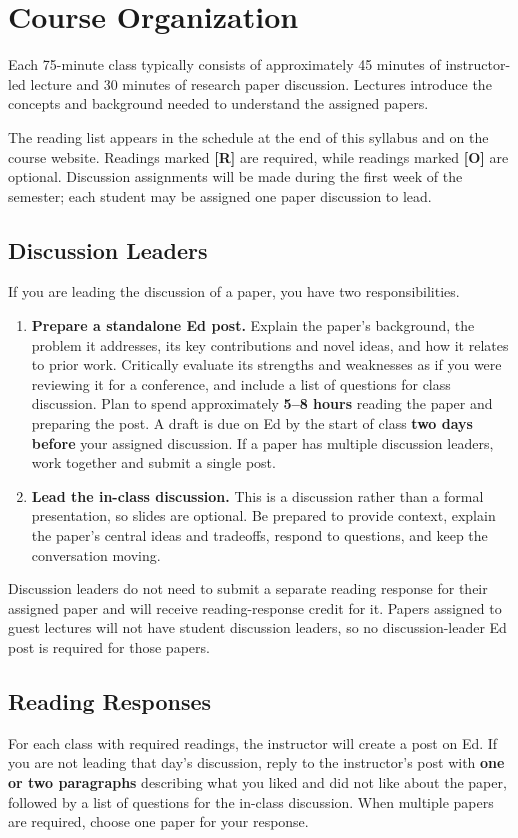 \documentclass[11pt]{article}
\begin{document}
\section{Course Organization}

Each 75-minute class typically consists of approximately 45 minutes of
instructor-led lecture and 30 minutes of research paper discussion. Lectures
introduce the concepts and background needed to understand the assigned papers.

The reading list appears in the schedule at the end of this syllabus and on the
course website. Readings marked \textbf{[R]} are required, while readings marked
\textbf{[O]} are optional. Discussion assignments will be made during the first
week of the semester; each student may be assigned one paper discussion to lead.

\subsection{Discussion Leaders}
If you are leading the discussion of a paper, you have two responsibilities.
\begin{enumerate}
  \item \textbf{Prepare a standalone Ed post.} Explain the paper's background, the problem it addresses, its key contributions and novel ideas, and how it relates to prior work. Critically evaluate its strengths and weaknesses as if you were reviewing it for a conference, and include a list of questions for class discussion. Plan to spend approximately \textbf{5--8 hours} reading the paper and preparing the post. A draft is due on Ed by the start of class \textbf{two days before} your assigned discussion. If a paper has multiple discussion leaders, work together and submit a single post.
  \item \textbf{Lead the in-class discussion.} This is a discussion rather than a formal presentation, so slides are optional. Be prepared to provide context, explain the paper's central ideas and tradeoffs, respond to questions, and keep the conversation moving.
\end{enumerate}
Discussion leaders do not need to submit a separate reading response for their
assigned paper and will receive reading-response credit for it. Papers assigned
to guest lectures will not have student discussion leaders, so no
discussion-leader Ed post is required for those papers.

\subsection{Reading Responses}
For each class with required readings, the instructor will create a post on Ed.
If you are not leading that day's discussion, reply to the instructor's post
with \textbf{one or two paragraphs} describing what you liked and did not like
about the paper, followed by a list of questions for the in-class discussion.
When multiple papers are required, choose one paper for your response.
\end{document}
